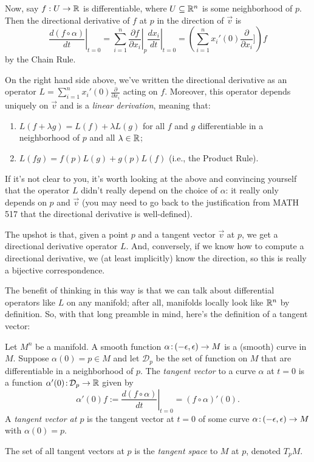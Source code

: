 Now, say $f: U \to \mathbb{R}$ is differentiable, where $U \subseteq \mathbb{R}^n$ is some neighborhood of $p$. Then the directional derivative of $f$ at $p$ in the direction of $\vec{v}$ is 
\[
	\left. \frac{d(f \circ \alpha)}{dt} \right|_{t=0} = \sum_{i=1}^n \left.\frac{\partial f}{\partial x_i}\right|_p \left. \frac{d x_i}{dt} \right|_{t=0} = \left(\sum_{i=1}^n x_i'(0) \frac{\partial}{\partial x_i}]\right)f
\]
by the Chain Rule. 

On the right hand side above, we've written the directional derivative as an operator $L = \sum_{i=1}^n x_i'(0) \frac{\partial}{\partial x_i}$ acting on $f$. Moreover, this operator depends uniquely on $\vec{v}$ and is a \emph{linear derivation}, meaning that:
\begin{enumerate}
	\item $L(f + \lambda g) = L(f) + \lambda L(g)$ for all $f$ and $g$ differentiable in a neighborhood of $p$ and all $\lambda \in \mathbb{R}$;
	\item $L(f g) = f(p) L(g) + g(p) L(f)$ (i.e., the Product Rule).
\end{enumerate}

If it's not clear to you, it's worth looking at the above and convincing yourself that the operator $L$ didn't really depend on the choice of $\alpha$: it really only depends on $p$ and $\vec{v}$ (you may need to go back to the justification from MATH 517 that the directional derivative is well-defined).

The upshot is that, given a point $p$ and a tangent vector $\vec{v}$ at $p$, we get a directional derivative operator $L$. And, conversely, if we know how to compute a directional derivative, we (at least implicitly) know the direction, so this is really a bijective correspondence.

The benefit of thinking in this way is that we can talk about differential operators like $L$ on any manifold; after all, manifolds locally look like $\mathbb{R}^n$ by definition. So, with that long preamble in mind, here's the definition of a tangent vector:

\begin{definition}\label{def:tangent vector}
	Let $M^n$ be a manifold. A smooth function $\alpha\colon\thinspace\!\! (-\epsilon, \epsilon) \to M$ is a (smooth) curve in $M$. Suppose $\alpha(0) = p \in M$ and let $\mathcal{D}_p$ be the set of function on $M$ that are differentiable in a neighborhood of $p$. The \emph{tangent vector} to a curve $\alpha$ at $t=0$ is a function $\alpha'(0)\colon\thinspace\!\! \mathcal{D}_p \to \mathbb{R}$ given by
	\[
		\alpha'(0)f := \left. \frac{d(f\circ \alpha)}{dt} \right|_{t=0} = (f\circ \alpha)'(0).
	\] 
	A \emph{tangent vector at $p$} is the tangent vector at $t=0$ of some curve $\alpha\colon\thinspace\!\! (-\epsilon, \epsilon) \to M$ with $\alpha(0) = p$.
	
	The set of all tangent vectors at $p$ is the \emph{tangent space} to $M$ at $p$, denoted $T_pM$.
\end{definition}

